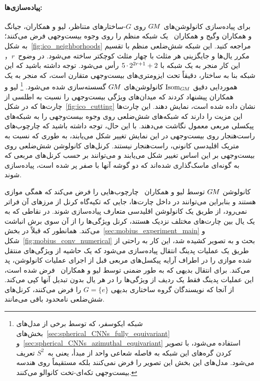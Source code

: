 \paragraph{پیاده‌سازی‌ها:}
برای پیاده‌سازی کانولوشن‌های $G\mkern-1.4muM$ روی $G$-ساختارهای متناظر،
لیو و همکاران\cite{liu2018icoAltAz}، جیانگ و همکاران\cite{zhang2019orientation} وگیج و همکاران~\cite{gaugeIco2019}
یک شبکه منظم را روی وجوه بیست‌وجهی فرض می‌کنند؛ به شکل~\ref{fig:ico_neighborhoods} مراجعه کنید.
این شبکه شش‌ضلعی منظم با تقسیم مکرر یال‌ها و جایگزینی هر مثلث با چهار مثلث کوچکتر ساخته می‌شود.
در وضوح~$r$， این کار منجر به یک شبکه با ${5\mkern-1mu\cdot\mkern-1mu 2^{2r+1} + 2}$ رأس می‌شود.
توجه داشته باشید که این شبکه بنا به ساختار، دقیقاً تحت ایزومتری‌های بیست‌وجهی متقارن است، که منجر به یک هموردایی دقیق $\operatorname{Isom}_{G\mkern-1.4muM}$ کانولوشن‌های $G\mkern-1.4muM$ گسسته‌سازی شده می‌شود.%
\footnote{
    شبکه ایکوسفر، که توسط برخی از مدل‌های بخش‌های~\ref{sec:spherical_CNNs_fully_equivariant} و~\ref{sec:spherical_CNNs_azimuthal_equivariant} استفاده می‌شود، با تصویر کردن گره‌های این شبکه به فاصله شعاعی واحد از مبدأ، یعنی به~$S^2$ تعریف می‌شود.
    مدل‌های این بخش این تصویر را فرض نمی‌کنند بلکه مستقیماً روی هندسه بیست‌وجهی تکه‌ای-تخت کانوالو می‌کنند.
}
لیو و همکاران\cite{liu2018icoAltAz} پیشنهاد کردند که میدان‌های ویژگی بیست‌وجهی را نسبت به اطلسی از چارت‌ها که در شکل~\ref{fig:ico_cutting} نشان داده شده است، نمایش دهند.
این چارت‌ها این مزیت را دارند که شبکه‌های شش‌ضلعی روی وجوه بیست‌وجهی را به شبکه‌های پیکسلی مربعی معمول نگاشت می‌دهند.
با این حال، توجه داشته باشید که چارچوب‌های راست‌هنجار روی بیست‌وجهی در این نمایش تغییر شکل می‌یابند، به طوری که نسبت به متریک اقلیدسی کانونی، راست‌هنجار نیستند.
کرنل‌های کانولوشن شش‌ضلعی روی بیست‌وجهی بر این اساس تغییر شکل می‌یابند و می‌توانند بر حسب کرنل‌های مربعی که به گونه‌ای ماسک‌گذاری شده‌اند که دو گوشه آنها با صفر پر شده است، پیاده‌سازی شوند.


کانولوشن $G\mkern-1.4muM$ توسط لیو و همکاران~\cite{liu2018icoAltAz} چارچوب‌هایی را فرض می‌کند که همگی موازی هستند و بنابراین می‌توانند در داخل چارت‌ها، جایی که تکیه‌گاه کرنل از مرزهای آن فراتر نمی‌رود، از طریق یک کانولوشن اقلیدسی متعارف پیاده‌سازی شوند.
در نقاطی که به یک یال بین چارت‌های مختلف نزدیک هستند، کرنل ویژگی‌ها را از آن سوی برش انباشت می‌کند.
همانطور که قبلاً در بخش~\ref{sec:mobius_experiment_main} و شکل~\ref{fig:mobius_conv_numerical} بحث و به تصویر کشیده شد، این کار به راحتی از طریق یک عملیات پدینگ انتقال پیاده‌سازی می‌شود که یک حاشیه از ویژگی‌های منتقل شده موازی را در اطراف آرایه پیکسل‌های مربعی قبل از اجرای عملیات کانولوشن، پد می‌کند.
برای انتقال بدیهی که به طور ضمنی توسط لیو و همکاران~\cite{liu2018icoAltAz} فرض شده است، این عملیات پدینگ فقط یک ردیف از ویژگی‌ها را در هر یال بدون تبدیل آنها کپی می‌کند.
از آنجا که نویسندگان گروه ساختاری بدیهی $G=\{e\}$ را فرض می‌کنند، کرنل‌های شش‌ضلعی نامحدود باقی می‌مانند.


